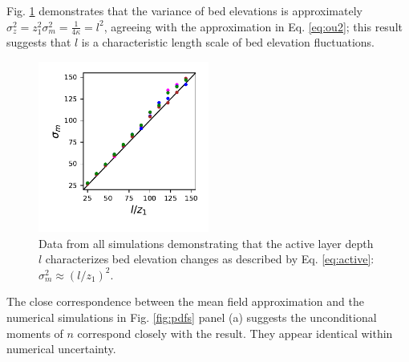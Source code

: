 Fig. \ref{fig:var} demonstrates that the variance of bed elevations is approximately $\sigma_z^2 = z_1^2 \sigma_m^2 = \frac{1}{4\kappa}=l^2$, agreeing with the approximation in Eq. \ref{eq:ou2}; this result suggests that $l$ is a characteristic length scale of bed elevation fluctuations.
\begin{figure}
	\centering
	\includegraphics[width=0.5\textwidth,keepaspectratio]{./figures/ch3/variance.pdf}
	\caption{Data from all simulations demonstrating that the active layer depth $l$ characterizes bed elevation changes as described by Eq. \ref{eq:active}: $\sigma_m^2 \approx (l/z_1)^2$. }
	\label{fig:var}
\end{figure}
\indent The close correspondence between the mean field approximation and the numerical simulations in Fig. \ref{fig:pdfs} panel (a) suggests the unconditional moments of $n$ correspond closely with the \citet{Ancey2008} result. They appear identical within numerical uncertainty.

